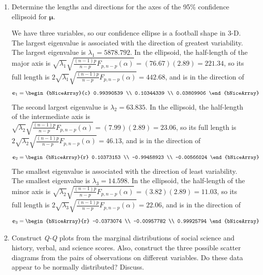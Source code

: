 \begin{enumerate}[label= (\alph*)]
    \item Determine the lengths and directions for the axes of the 95\% confidence ellipsoid for $\bm{\mu}$.
    \newline
    \par
    We have three variables, so our confidence ellipse is a football shape in 3-D.
    The largest eigenvalue is associated with the direction of greatest variability. The largest eigenvalue is $\lambda_{1} = 5878.792$. In the ellipsoid, the half-length of the major axis is $\sqrt{\lambda_{1}}\sqrt{\frac{(n-1)p}{n-p}F_{p, n-p}(\alpha)} = (76.67)(2.89) = 221.34$, so its full length is $2\sqrt{\lambda_{1}}\sqrt{\frac{(n-1)p}{n-p}F_{p, n-p}(\alpha)} = 442.68$, and is in the direction of
    \[
        \textbf{e}_{1}
        =
        \begin{bNiceArray}{c}
            0.99390539 \\
            0.10344339 \\
            0.03809906
        \end{bNiceArray}
    \]
    The second largest eigenvalue is $\lambda_{2} = 63.835$. In the ellipsoid, the half-length of the intermediate axis is $\sqrt{\lambda_{2}}\sqrt{\frac{(n-1)p}{n-p}F_{p, n-p}(\alpha)} = (7.99)(2.89) = 23.06$, so its full length is $2\sqrt{\lambda_{2}}\sqrt{\frac{(n-1)p}{n-p}F_{p, n-p}(\alpha)} = 46.13$, and is in the direction of
    \[
        \textbf{e}_{2}
        =
        \begin{bNiceArray}{r}
             0.10373153 \\
            -0.99458923 \\
            -0.00566024
        \end{bNiceArray}
    \]
    The smallest eigenvalue is associated with the direction of least variability. The smallest eigenvalue is $\lambda_{3} = 14.598$. In the ellipsoid, the half-length of the minor axis is $\sqrt{\lambda_{2}}\sqrt{\frac{(n-1)p}{n-p}F_{p, n-p}(\alpha)} = (3.82)(2.89) = 11.03$, so its full length is $2\sqrt{\lambda_{3}}\sqrt{\frac{(n-1)p}{n-p}F_{p, n-p}(\alpha)} = 22.06$, and is in the direction of
    \[
        \textbf{e}_{3}
        =
        \begin{bNiceArray}{r}
            -0.0373074  \\
            -0.00957782 \\
             0.99925794 
        \end{bNiceArray}
    \]
    
    \item Construct \textit{Q-Q} plots from the marginal distributions of social science and history,
    verbal, and science scores. Also, construct the three possible scatter diagrams from
    the pairs of observations on different variables. Do these data appear to be normally
    distributed? Discuss.


\end{enumerate}
